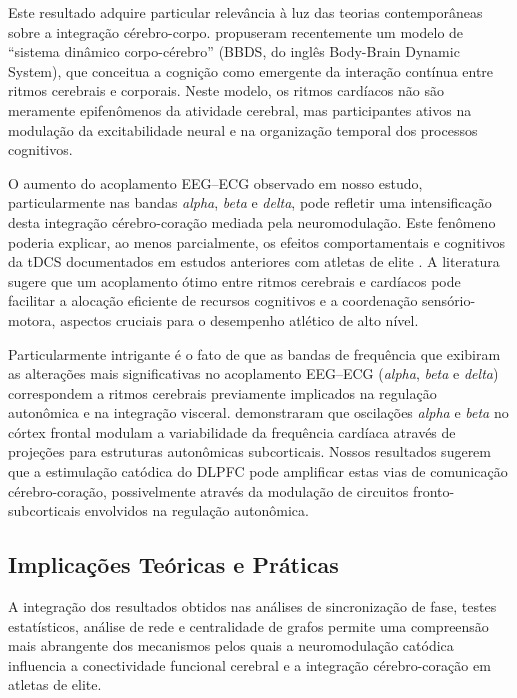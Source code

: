 Este resultado adquire particular relevância à luz das teorias contemporâneas sobre a integração cérebro-corpo. \cite{criscuolo2022cognition} propuseram recentemente um modelo de ``sistema dinâmico corpo-cérebro'' (BBDS, do inglês Body-Brain Dynamic System), que conceitua a cognição como emergente da interação contínua entre ritmos cerebrais e corporais. Neste modelo, os ritmos cardíacos não são meramente epifenômenos da atividade cerebral, mas participantes ativos na modulação da excitabilidade neural e na organização temporal dos processos cognitivos.

O aumento do acoplamento EEG--ECG observado em nosso estudo, particularmente nas bandas \emph{alpha}, \emph{beta} e \emph{delta}, pode refletir uma intensificação desta integração cérebro-coração mediada pela neuromodulação. Este fenômeno poderia explicar, ao menos parcialmente, os efeitos comportamentais e cognitivos da tDCS documentados em estudos anteriores com atletas de elite \cite{singh2024evaluating}. A literatura sugere que um acoplamento ótimo entre ritmos cerebrais e cardíacos pode facilitar a alocação eficiente de recursos cognitivos e a coordenação sensório-motora, aspectos cruciais para o desempenho atlético de alto nível.

Particularmente intrigante é o fato de que as bandas de frequência que exibiram as alterações mais significativas no acoplamento EEG--ECG (\emph{alpha}, \emph{beta} e \emph{delta}) correspondem a ritmos cerebrais previamente implicados na regulação autonômica e na integração visceral. \cite{criscuolo2022cognition} demonstraram que oscilações \emph{alpha} e \emph{beta} no córtex frontal modulam a variabilidade da frequência cardíaca através de projeções para estruturas autonômicas subcorticais. Nossos resultados sugerem que a estimulação catódica do DLPFC pode amplificar estas vias de comunicação cérebro-coração, possivelmente através da modulação de circuitos fronto-subcorticais envolvidos na regulação autonômica.

\subsection{Implicações Teóricas e Práticas}
A integração dos resultados obtidos nas análises de sincronização de fase, testes estatísticos, análise de rede e centralidade de grafos permite uma compreensão mais abrangente dos mecanismos pelos quais a neuromodulação catódica influencia a conectividade funcional cerebral e a integração cérebro-coração em atletas de elite.

